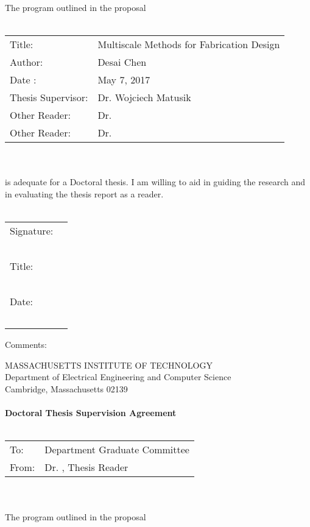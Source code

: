 \documentclass[11pt]{article}
\begin{document}
The program outlined in the proposal\\~\\
\begin{tabular}{p{4cm} l}
	Title: & Multiscale Methods for Fabrication Design\\
	Author: & Desai Chen\\
	Date : & May 7, 2017 \\
	Thesis Supervisor: & Dr. Wojciech Matusik\\
	Other Reader: & Dr.\\
	Other Reader: & Dr.
\end{tabular}\\~\\
is adequate for a Doctoral thesis. I am willing to aid in guiding the research and in
evaluating the thesis report as a reader.\\~\\
\begin{flushright}
	\begin{tabular}{l l}
		Signature: & \underline{\hspace{6cm}}\\~\\
		Title: & \underline{\hspace{6cm}}\\~\\
		Date: & \underline{\hspace{6cm}}\\~\\
	\end{tabular}
\end{flushright}
Comments:
\newpage
\begin{center}
	MASSACHUSETTS INSTITUTE OF TECHNOLOGY\\
	Department of Electrical Engineering and Computer Science\\
	Cambridge, Massachusetts 02139\\~\\
	\textbf{Doctoral Thesis Supervision Agreement}\\~\\
\end{center}
\begin{tabular}{p{2cm} p{10cm}}
	To: & Department Graduate Committee \\
	From: & Dr. , Thesis Reader
\end{tabular}\\~\\
The program outlined in the proposal\\~\\
\end{document}
